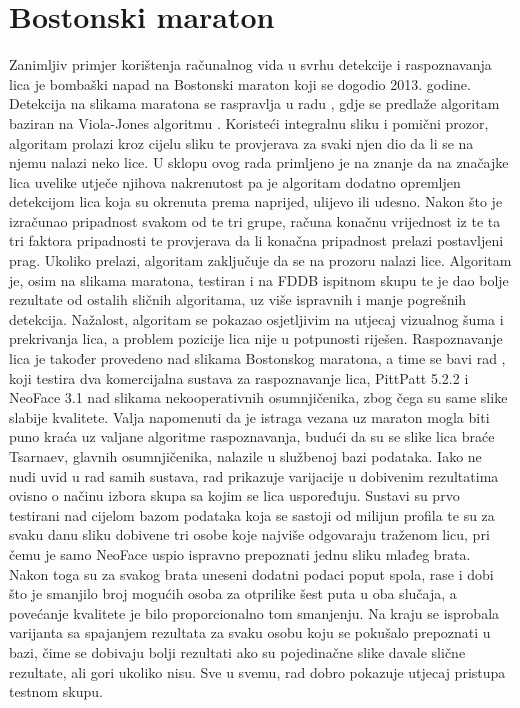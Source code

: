 \documentclass[times, utf8, seminar, numeric]{fer}
\begin{document}
\section{Bostonski maraton}

Zanimljiv primjer korištenja računalnog vida u svrhu detekcije i raspoznavanja lica je bombaški napad na Bostonski maraton koji se dogodio 2013. godine. Detekcija na slikama maratona se raspravlja u radu \cite{barr2014effectiveness}, gdje se predlaže algoritam baziran na Viola-Jones algoritmu \cite{Viola01rapidobject}. Koristeći integralnu sliku i pomični prozor, algoritam prolazi kroz cijelu sliku te provjerava za svaki njen dio da li se na njemu nalazi neko lice. U sklopu ovog rada primljeno je na znanje da na značajke lica uvelike utječe njihova nakrenutost pa je algoritam dodatno opremljen detekcijom lica koja su okrenuta prema naprijed, ulijevo ili udesno. Nakon što je izračunao pripadnost svakom od te tri grupe, računa konačnu vrijednost iz te ta tri faktora pripadnosti te provjerava da li konačna pripadnost prelazi postavljeni prag. Ukoliko prelazi, algoritam zaključuje da se na prozoru nalazi lice. Algoritam je, osim na slikama maratona,  testiran i na FDDB ispitnom skupu te je dao bolje rezultate od ostalih sličnih algoritama, uz više ispravnih i manje pogrešnih detekcija. Nažalost, algoritam se pokazao osjetljivim na utjecaj vizualnog šuma i prekrivanja lica, a problem pozicije lica nije u potpunosti riješen.
Raspoznavanje lica je također provedeno nad slikama Bostonskog maratona, a time se bavi rad \cite{Klontz13acase}, koji testira dva komercijalna sustava za raspoznavanje lica, PittPatt 5.2.2 i NeoFace 3.1 nad slikama nekooperativnih osumnjičenika, zbog čega su same slike slabije kvalitete. Valja napomenuti da je istraga vezana uz maraton mogla biti puno kraća uz valjane algoritme raspoznavanja, budući da su se slike lica braće Tsarnaev, glavnih osumnjičenika, nalazile u službenoj bazi podataka. Iako ne nudi uvid u rad samih sustava, rad prikazuje varijacije u dobivenim rezultatima ovisno o načinu izbora skupa sa kojim se lica uspoređuju. Sustavi su prvo testirani nad cijelom bazom podataka koja se sastoji od milijun profila te su za svaku danu sliku dobivene tri osobe koje najviše odgovaraju traženom licu, pri čemu je samo NeoFace uspio ispravno prepoznati jednu sliku mlađeg brata. Nakon toga su za svakog brata uneseni dodatni podaci poput spola, rase i dobi što je smanjilo broj mogućih osoba za otprilike šest puta u oba slučaja, a povećanje kvalitete je bilo proporcionalno tom smanjenju. Na kraju se isprobala varijanta sa spajanjem rezultata za svaku osobu koju se pokušalo prepoznati u bazi, čime se dobivaju bolji rezultati ako su pojedinačne slike davale slične rezultate, ali gori ukoliko nisu. Sve u svemu, rad dobro pokazuje utjecaj pristupa testnom skupu. 
\end{document}
